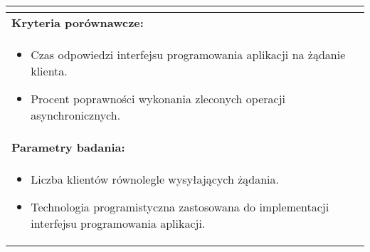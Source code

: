 \begin{longtable}[c]{|llll|}
{\begin{itemize}[label={}]
          \end{itemize}
    }                                                           \\ \hline
    \multicolumn{4}{|l|}{\textbf{Kryteria porównawcze:}}                             \\ \hline
    \multicolumn{4}{|p{\linewidth}|}{
        \begin{itemize}
            \item Czas odpowiedzi interfejsu programowania aplikacji na żądanie klienta.
            \item Procent poprawności wykonania zleconych operacji asynchronicznych.
        \end{itemize}
    }                                                           \\ \hline
    \multicolumn{4}{|l|}{\textbf{Parametry badania:}}                                \\ \hline
    \multicolumn{4}{|p{\linewidth}|}{
        \begin{itemize}
            \item Liczba klientów równolegle wysyłających żądania.
            \item Technologia programistyczna zastosowana do implementacji interfejsu programowania aplikacji.
        \end{itemize}
    }                                                           \\ \hline
\end{longtable}


